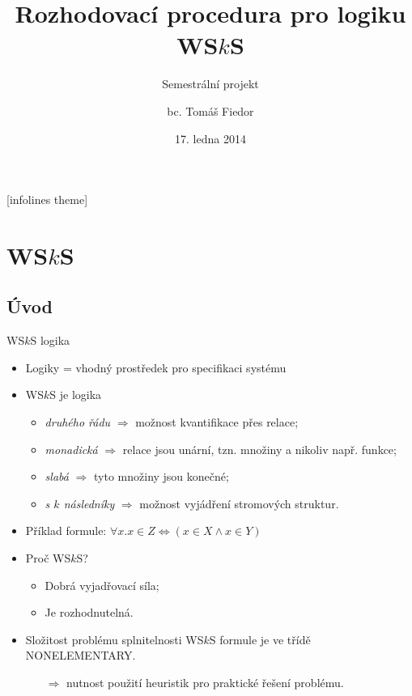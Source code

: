 \documentclass{beamer}
\title[Rozhodovací procedura pro logiku WS$k$S]{Rozhodovací procedura pro logiku
WS$k$S}
\subtitle{Semestrální projekt}
\author[T. Fiedor]{bc. Tomáš Fiedor}
\date{17. ledna 2014}
\institute[vedoucí: Lengál]{pod vedením Ing. Ondřeje Lengála}
\begin{document}
[infolines theme]

  \begin{frame}[plain]
    \titlepage
  \end{frame}
	
	\section{WS$k$S}
	\subsection{Úvod}
	\begin{frame}{WS$k$S logika}
     \begin{itemize}
       \item Logiky = vhodný prostředek pro specifikaci systému
       \item WS$k$S je logika
       \begin{itemize}
         \pause
         \item \emph{druhého řádu} $\Rightarrow$ možnost kvantifikace přes
         relace;
         \pause
         \item \emph{monadická} $\Rightarrow$ relace jsou unární, tzn. množiny a
         nikoliv např. funkce;
         \pause
         \item \emph{slabá} $\Rightarrow$ tyto množiny jsou konečné;
         \pause
         \item \emph{s $k$ následníky} $\Rightarrow$ možnost vyjádření stromových
         struktur.
         \pause
       \end{itemize}
       \item Příklad formule: $\forall x. x \in Z \Leftrightarrow (x \in X
       \wedge x \in Y)$
       \pause
       \item Proč WS$k$S?
       \pause
       \begin{itemize}
         \item Dobrá vyjadřovací síla;
         \pause
         \item Je rozhodnutelná. 
       \end{itemize}
         \pause
         \item Složitost problému splnitelnosti WS$k$S formule je ve třídě
         NONELEMENTARY.
         \pause
         \begin{itemize}
           \item[$\Rightarrow$] nutnost použití heuristik pro praktické řešení
           problému.
         \end{itemize}
     \end{itemize}
	\end{frame}
	
\end{document}

